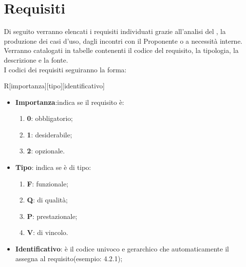 \section{Requisiti}
\label{sec:Requisiti}
Di seguito verranno elencati i requisiti individuati grazie all'analisi del , la produzione dei casi d'uso, dagli incontri con il Proponente o a necessità interne. Verranno catalogati in tabelle contenenti il codice del requisito, la tipologia, la descrizione e la fonte.\\
I codici dei requisiti seguiranno la forma:
\begin{center}
	R[importanza][tipo][identificativo]
\end{center}
\begin{itemize}
	\item \textbf{Importanza}:indica se il requisito è:
	\begin{enumerate}
		\item \textbf{0}: obbligatorio;
		\item \textbf{1}: desiderabile;
		\item \textbf{2}: opzionale.
	\end{enumerate}
	\item \textbf{Tipo}: indica se è di tipo:
	\begin{enumerate}
		\item \textbf{F}: funzionale;
		\item \textbf{Q}: di qualità;
		\item \textbf{P}: prestazionale;
		\item \textbf{V}: di vincolo.
	\end{enumerate}
	\item \textbf{Identificativo}: è il codice univoco e gerarchico che automaticamente il  assegna al requisito(esempio: 4.2.1);
\end{itemize}
